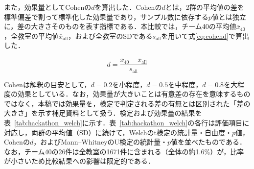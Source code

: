 また，効果量としてCohenの$d$\cite{cohen1988}を算出した．Cohenの$d$とは，2群の平均値の差を標準偏差で割って標準化した効果量であり，サンプル数に依存する$p$値とは独立に，差の大きさそのものを表す指標である．本比較では，チーム40の平均値$\bar{x}_{40}$，全教室の平均値$\bar{x}_{\mathrm{all}}$，および全教室のSDである$s_{\mathrm{all}}$を用いて式\ref{eq:cohend}で算出した．

\begin{equation}
    \label{eq:cohend}
    d = \frac{\bar{x}_{40} - \bar{x}_{\mathrm{all}}}{s_{\mathrm{all}}}
\end{equation}

Cohen\cite{cohen1988}は解釈の目安として，$d=0.2$を小程度，$d=0.5$を中程度，$d=0.8$を大程度の効果としている．なお，効果量が大きいことは有意差の存在を意味するものではなく，本稿では効果量を，検定で判定される差の有無とは区別された「差の大きさ」を示す補足資料として扱う．検定および効果量の結果を表~\ref{tab:hackathon_welch}に示す．表~\ref{tab:hackathon_welch}の各行は評価項目に対応し，両群の平均値（SD）に続けて，Welchのt検定の統計量・自由度・$p$値，Cohenの$d$，およびMann--WhitneyのU検定の統計量・$p$値を並べたものである．なお，チーム40の26件は全教室の1671件に含まれる（全体の約1.6\%）が，比率が小さいため比較結果への影響は限定的である．

\begin{table}[htbp]
  \centering
  \caption{チーム40と全教室の群間比較（Welchのt検定，Cohenの$d$，Mann--WhitneyのU検定）}
  \label{tab:hackathon_welch}
\end{table}

